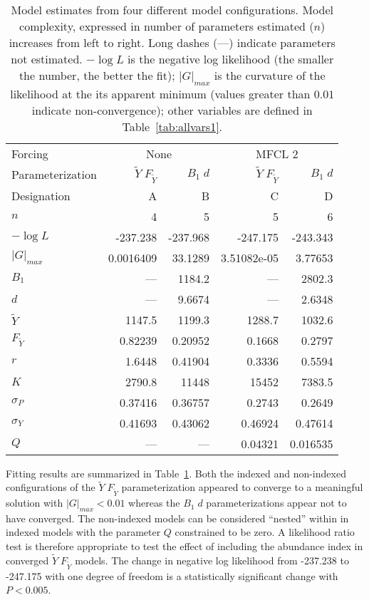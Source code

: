 \documentclass[12pt,letterpaper,twoside]{article}
\newcommand\MSY{\widetilde{Y}}
\newcommand\Fmsy{F_{\MSY}}
\newcommand\MSYFmsy{\MSY\;\Fmsy}
\newcommand\Bd{B_1\; d}
\begin{document}
\begin{table}
\caption{
Model estimates from four different model configurations.
Model complexity, expressed in number of parameters estimated ($n$)
increases from left to right. Long dashes (---) indicate parameters
not estimated. 
{%
$-\log L$ is the negative log likelihood (the smaller the number, the
better the fit);
$|G|_{max}$ is the curvature of the likelihood at the its apparent
minimum (values greater than $0.01$ indicate non-convergence);
other variables are defined in Table~\ref{tab:allvars1}.
}
\label{tag:ests4}}
\begin{center}
\begin{tabular}{|l|rr|rr|}
\hline
Forcing & \multicolumn{2}{c|}{None}&\multicolumn{2}{c|}{MFCL 2}\\
\cline{2-3}\cline{4-5}
Parameterization&$\MSYFmsy$&$\Bd$&$\MSYFmsy$&$\Bd$\\
Designation& A & B& C& D\\
\hline
\hline
$n$ & 4 & 5 & 5 & 6\\
$-\log L$ & -237.238 & -237.968 & -247.175 & -243.343\\
$|G|_{max}$ & 0.0016409 & 33.1289 & 3.51082e-05 & 3.77653\\
\hline
$B_1$ & --- & 1184.2 & --- & 2802.3\\
$d$ & --- & 9.6674 & --- & 2.6348\\
$\MSY$ & 1147.5 & 1199.3 & 1288.7 & 1032.6\\
$\Fmsy$ & 0.82239 & 0.20952 & 0.1668 & 0.2797\\
$r$ & 1.6448 & 0.41904 & 0.3336 & 0.5594\\
$K$ & 2790.8 & 11448 & 15452 & 7383.5\\
$\sigma_P$ & 0.37416 & 0.36757 & 0.2743 & 0.2649\\
$\sigma_Y$ & 0.41693 & 0.43062 & 0.46924 & 0.47614\\
$Q$ & --- & --- & 0.04321 & 0.016535\\
\hline
\end{tabular}
\end{center}
\end{table}

Fitting results are summarized in Table~\ref{tag:ests4}.
Both the indexed and non-indexed configurations of the $\MSYFmsy$
parameterization
appeared to converge to a meaningful solution with $|G|_{max}<0.01$
whereas the  $\Bd$ parameterizations appear not to have converged. 
The non-indexed models can be considered ``nested'' within in indexed
models with the parameter $Q$ constrained to be zero. A likelihood
ratio test is therefore appropriate to test the effect of including
the abundance index in converged $\MSYFmsy$ models. 
The change in negative log likelihood
from -237.238 to -247.175 with one degree of freedom is a statistically
significant change with $P<0.005$.
\end{document}

